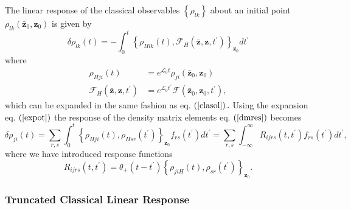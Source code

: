 \documentclass[aps,preprint]{revtex4}%
\begin{document}
The linear response of the classical observables $\left\{  \rho_{lk}\right\}
$ about an initial point $\rho_{lk}\left(  \mathbf{\bar{z}}_{0},\mathbf{z}%
_{0}\right)  $ is given by
\begin{equation}
\delta\rho_{lk}\left(  t\right)  =-\int_{0}^{t}\left\{  \rho_{Hlk}\left(
t\right)  ,\mathcal{F}_{H}\left(  \mathbf{\bar{z}},\mathbf{z,}t^{\prime
}\right)  \right\}  _{\mathbf{z}_{0}}dt^{\prime} \label{dmres}%
\end{equation}
where
\begin{align}
\rho_{Hji}\left(  t\right)   &  =e^{\mathcal{L}_{0}t}\rho_{ji}\left(
\mathbf{\bar{z}}_{0},\mathbf{z}_{0}\right) \nonumber\\
\mathcal{F}_{H}\left(  \mathbf{\bar{z}},\mathbf{z,}t^{\prime}\right)   &
=e^{\mathcal{L}_{0}t^{\prime}}\mathcal{F}\left(  \mathbf{\bar{z}}%
_{0},\mathbf{z}_{0},t^{\prime}\right)  ,
\end{align}
which can be expanded in the same fashion as eq. $\left(  \ref{clasol}\right)
.$ Using the expansion eq. $\left(  \ref{expot}\right)  $ the response of the
density matrix elements eq. $\left(  \ref{dmres}\right)  $ becomes
\begin{equation}
\delta\rho_{ji}\left(  t\right)  =\sum_{r,s}\int_{0}^{t}\left\{  \rho
_{Hji}\left(  t\right)  ,\rho_{Hsr}\left(  t^{\prime}\right)  \right\}
_{\mathbf{z}_{0}}f_{rs}\left(  t^{\prime}\right)  dt^{\prime}=\sum_{r,s}%
\int_{-\infty}^{\infty}R_{ijrs}\left(  t,t^{\prime}\right)  f_{rs}\left(
t^{\prime}\right)  dt^{\prime},
\end{equation}
where we have introduced response functions
\begin{equation}
R_{ijrs}\left(  t,t^{\prime}\right)  =\theta_{+}\left(  t-t^{\prime}\right)
\left\{  \rho_{jiH}\left(  t\right)  ,\rho_{sr}\left(  t^{\prime}\right)
\right\}  _{\mathbf{z}_{0}}. \label{classres}%
\end{equation}


\subsubsection{Truncated Classical Linear Response}
\end{document}
